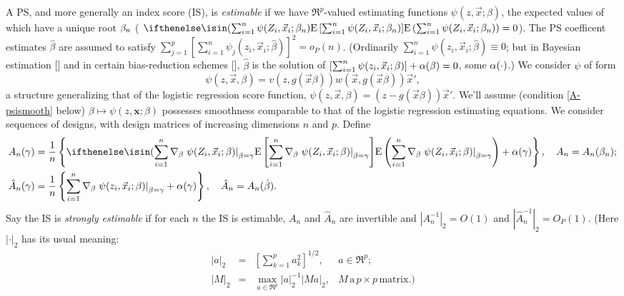 \documentclass{article}
\theoremstyle{remark}
\begin{document}
A PS, and more generally an index score (IS), is \textit{estimable} if we have $\Re^{p}$-valued estimating functions $\psi (z, \vec{x}; \beta)$, the expected values of which have a unique root  $\beta_{n }$ (  $\E{ \sum_{i=1}^{n}\psi(Z_{i}, \vec{x}_{i}; \betatrue) } =0 $). 
The PS coefficent estimates  $\hat{\beta}$ are assumed to satisfy $\sum_{j=1}^{p}\left[\sum_{i=1}^{n}\psi_{j}(z_{i}, \vec{x}_{i}; \hat{\beta})\right]^{2} = o_{P}(n)$. (Ordinarily $\sum_{i=1}^{n}\psi(z_{i}, \vec{x}_{i}; \hat{\beta}) \equiv 0$; but in Bayesian estimation [\citealp[e.g.,][]{gelman2008weakly}] and in certain bias-reduction schemes [\citealp{firth:1993,kosmidisFirth2009bias}], $\hat\beta$ is the solution of $[\sum_{i=1}^{n}\psi(z_{i}, \vec{x}_{i}; \beta)] + \alpha(\beta) =0$, some $\alpha(\cdot)$.)
We consider $\psi$ of form 
\begin{equation}\label{eq:20}
  \psi(z, \vec{x}, \beta) = v(z, g(\vec{x}\beta)) w(\vec{x}, g(\vec{x}\beta)) \vec{x}',
\end{equation}
a structure generalizing that of the logistic regression score function, $\psi(z, \vec{x}, \beta) = (z - g(\vec{x}\beta))\vec{x}'$.  
We'll assume (condition \ref{A-psismooth} below) $\beta \mapsto \psi(z, \mathbf{x}; \beta)$ possesses smoothness comparable to that of the logistic regression estimating equations. We consider sequences of designs, with design matrices of increasing dimensions $n $ and $p$.  Define
\begin{align}
  \label{eq:7}
 A_{n}(\gamma ) &= \frac{1}{n}\left\{ \E{ \sum_{i=1}^{n} \nabla_{\beta} \left. \psi(Z_{i}, \vec{x}_{i}; \beta) \right|_{\beta =  \gamma}} + \pen{\gamma}\right\}, \quad A_{n}  =  A_{n}(\betatrue);  \\
 \hat{A}_{n}(\gamma ) &= \frac{1}{n}\left\{ \sum_{i=1}^{n} \nabla_{\beta} \left. \psi(z_{i}, \vec{x}_{i}; \beta) \right|_{\beta =  \gamma} + \pen{\gamma}\right\}, \quad \hat{A}_{n}  =  A_{n}(\hat\beta).  \nonumber
\end{align}
Say the IS is \textit{strongly estimable} if for each $n$ the IS is estimable, $A_{n}$ and $\hat{A}_{n}$  
are invertible and $|{A}_{n}^{-1}|_{2}=O(1)$ and $|\hat{A}_{n}^{-1}|_{2}= O_{P}(1)$. 
(Here $| \cdot |_{2}$ has its usual meaning:
\begin{equation*}
  \begin{array}{rclr}
    |{a}|_{2} & = & \left[ \sum_{k=1}^{p} a_{k}^{2} \right]^{1/2}, & a \in \Re^{p};\\    |M|_{2} & = & \max_{a \in \Re^{p} } {|a|_{2}^{-1}}{|Ma|_{2}},& M\, \mathrm{a}\, p\times p\, \mathrm{matrix}.)
  \end{array}
\end{equation*}
\end{document}
